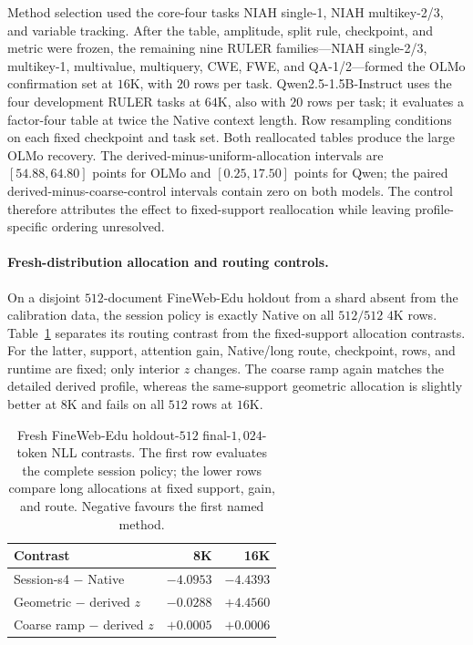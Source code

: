 Method selection used the core-four tasks NIAH single-1, NIAH multikey-2/3,
and variable tracking. After the table, amplitude, split rule, checkpoint, and
metric were frozen, the remaining nine RULER families---NIAH single-2/3,
multikey-1, multivalue, multiquery, CWE, FWE, and QA-1/2---formed the OLMo
confirmation set at $16$K, with $20$ rows per task. Qwen2.5-1.5B-Instruct
\citep{qwen2024qwen25} uses the four development RULER tasks
at $64$K, also with $20$ rows per task; it evaluates a factor-four table at
twice the Native context length. Row resampling conditions on each fixed
checkpoint and task set. Both reallocated tables produce the large OLMo
recovery. The derived-minus-uniform-allocation intervals are $[54.88,64.80]$ points for
OLMo and $[0.25,17.50]$ points for Qwen; the paired
derived-minus-coarse-control intervals contain zero on both models. The
control therefore attributes the effect to
fixed-support reallocation while leaving profile-specific ordering unresolved.

\paragraph{Fresh-distribution allocation and routing controls.}
On a disjoint $512$-document FineWeb-Edu holdout from a shard absent from the
calibration data, the session policy is exactly Native on all $512/512$ $4$K
rows. Table~\ref{tab:fresh-fineweb-controls} separates its routing contrast from
the fixed-support allocation contrasts. For the latter, support, attention gain,
Native/long route, checkpoint, rows, and runtime are fixed; only interior $z$
changes. The coarse ramp again matches the detailed derived profile, whereas
the same-support geometric allocation is slightly better at $8$K and fails on
all $512$ rows at $16$K.

\begin{table}[ht]
\caption{Fresh FineWeb-Edu holdout-$512$ final-$1{,}024$-token NLL contrasts.
The first row evaluates the complete session policy; the lower rows compare
long allocations at fixed support, gain, and route. Negative favours the first
named method.}
\label{tab:fresh-fineweb-controls}
\centering
\small
\begin{tabular}{@{}lrr@{}}
\toprule
Contrast & 8K & 16K \\
\midrule
Session-s4 $-$ Native & $-4.0953$ & $-4.4393$ \\
Geometric $-$ derived $z$ & $-0.0288$ & $+4.4560$ \\
Coarse ramp $-$ derived $z$ & $+0.0005$ & $+0.0006$ \\
\bottomrule
\end{tabular}
\end{table}

